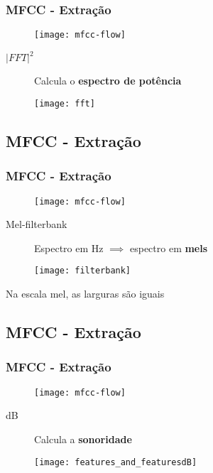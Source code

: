 \begin{frame}
\frametitle{MFCC - Extração}
\begin{figure}[ht]
    \centering
    \texttt{[image: mfcc-flow]}
\end{figure}

\begin{description}
    \item[$|FFT|^2$] Calcula o \textbf{espectro de potência}
    \pause
\end{description}
\begin{figure}[ht]
    \centering
    \texttt{[image: fft]}
\end{figure}
\end{frame}

\subsection{MFCC - Extração}

\begin{frame}
\frametitle{MFCC - Extração}
\begin{figure}[ht]
    \centering
    \texttt{[image: mfcc-flow]}
\end{figure}

\begin{description}
    \item[Mel-filterbank] Espectro em Hz $\implies$ espectro em \textbf{mels}
    \pause
\end{description}
\begin{figure}[ht]
    \centering
    \texttt{[image: filterbank]}
\end{figure}

\begin{description}
    \item Na escala mel, as larguras são iguais
\end{description}
\end{frame}

\subsection{MFCC - Extração}

\begin{frame}
\frametitle{MFCC - Extração}
\begin{figure}[ht]
    \centering
    \texttt{[image: mfcc-flow]}
\end{figure}

\begin{description}
    \item[dB] Calcula a \textbf{sonoridade}
    \pause
\end{description}
\begin{figure}[ht]
    \centering
    \texttt{[image: features\_and\_featuresdB]}
\end{figure}
\end{frame}

